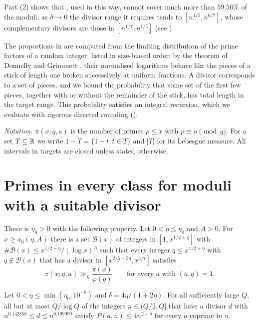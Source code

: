 \documentclass[11pt,colorlinks]{charlie}
\newcommand{\cB}{\mathcal{B}}
\begin{document}
Part (2) shows that , used in this way, cannot cover much more than $59.56\%$ of the moduli: as $\delta\to0$ the divisor range it requires tends to $[n^{4/5},n^{6/7}]$, whose complementary divisors are those in $[n^{1/7},n^{1/5}]$ (see ).

The proportions in  are computed from the limiting distribution of the prime factors of a random integer, listed in size-biased order: by the theorem of Donnelly and Grimmett \cite{DG}, their normalised logarithms behave like the pieces of a stick of length one broken successively at uniform fractions. A divisor corresponds to a set of pieces, and we bound the probability that some set of the first few pieces, together with or without the remainder of the stick, has total length in the target range. This probability satisfies an integral recursion, which we evaluate with rigorous directed rounding ().

\emph{Notation.} $\pi(x;q,a)$ is the number of primes $p\le x$ with $p\equiv a\pmod q$. For a set $T\subseteq\mathbb{R}$ we write $1-T=\{1-t:t\in T\}$ and $|T|$ for its Lebesgue measure. All intervals in targets are closed unless stated otherwise.

\section{Primes in every class for moduli with a suitable divisor}\label{sec:reduction}
\begin{proposition}\label{prop:maynard}
There is $\eta_0>0$ with the following property. Let $0<\eta\le\eta_0$ and $A>0$. For $x\ge x_0(\eta,A)$ there is a set $\cB(x)$ of integers in $[1,x^{1/2+\eta}]$ with $\#\cB(x)\le x^{1/2+\eta}/(\log x)^A$ such that every integer $q\le x^{1/2+\eta}$ with $q\notin\cB(x)$ that has a divisor in $[x^{2/5+5\eta},x^{3/7}]$ satisfies
\[
 \pi(x;q,a)\gg_\eta\frac{\pi(x)}{\varphi(q)}\qquad\text{for every $a$ with $(a,q)=1$.}
\]
\end{proposition}

\begin{lemma}\label{lem:reduction}
Let $0<\eta\le\min(\eta_0,10^{-8})$ and $\delta=4\eta/(1+2\eta)$. For all sufficiently large $Q$, all but at most $Q/\log Q$ of the integers $n\in(Q/2,Q]$ that have a divisor $d$ with $n^{0.142858}\le d\le n^{0.199999}$ satisfy $P(a,n)\le4n^{2-\delta}$ for every $a$ coprime to $n$.
\end{lemma}
\end{document}
